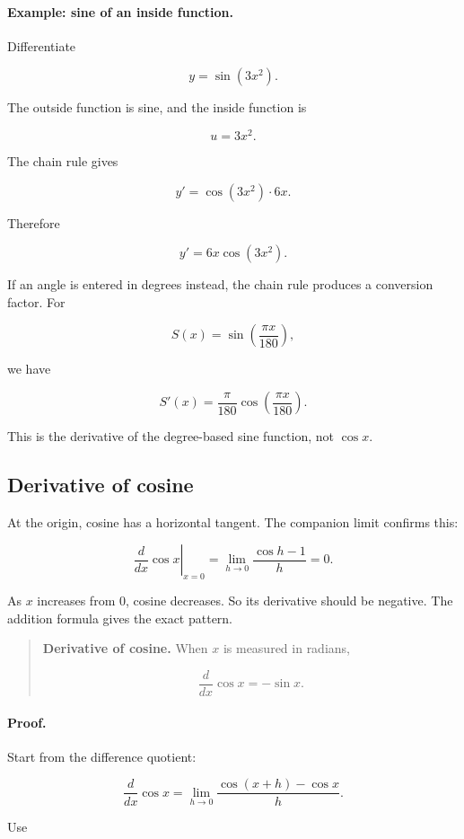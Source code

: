 \paragraph{Example: sine of an inside function.}
Differentiate

\[
y=\sin(3x^2).
\]

The outside function is sine, and the inside function is

\[
u=3x^2.
\]

The chain rule gives

\[
y'
=
\cos(3x^2)\cdot6x.
\]

Therefore

\[
\boxed{
y'=6x\cos(3x^2).
}
\]

If an angle is entered in degrees instead, the chain rule produces a conversion
factor. For

\[
S(x)=\sin\left(\frac{\pi x}{180}\right),
\]

we have

\[
S'(x)
=
\frac{\pi}{180}
\cos\left(\frac{\pi x}{180}\right).
\]

This is the derivative of the degree-based sine function, not \(\cos x\).

\subsection{Derivative of cosine}
\label{subsec:deriv-cosine}

At the origin, cosine has a horizontal tangent. The companion limit confirms this:

\[
\left.\frac{d}{dx}\cos x\right|_{x=0}
=
\lim_{h\to0}\frac{\cos h-1}{h}
=
0.
\]

As \(x\) increases from \(0\), cosine decreases. So its derivative should be negative.
The addition formula gives the exact pattern.

\begin{quote}
\textbf{Derivative of cosine.}
When \(x\) is measured in radians,

\[
\boxed{
\frac{d}{dx}\cos x=-\sin x.
}
\]
\end{quote}

\paragraph{Proof.}
Start from the difference quotient:

\[
\frac{d}{dx}\cos x
=
\lim_{h\to0}
\frac{\cos(x+h)-\cos x}{h}.
\]

Use

